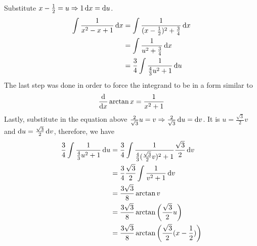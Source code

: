 \begin{solution}
    Substitute \(x - \frac{1}{2} = u \Rightarrow 1 \mathop{}\!\mathrm{d} x = \mathop{}\!\mathrm{d} u\).
    \begin{align}
        \int \frac{1}{x^2 -x + 1} \mathop{}\!\mathrm{d} x &= \int \frac{1}{(x - \frac{1}{2})^2 + \frac{3}{4}} \mathop{}\!\mathrm{d} x\\
        &= \int \frac{1}{u^2 + \frac{3}{4}} \mathop{}\!\mathrm{d} x \\
        &= \frac{3}{4} \int \frac{1}{\frac{4}{3} u^2 + 1} \mathop{}\!\mathrm{d} u
    \end{align}
    The last step was done in order to force the integrand to be in a form similar to
    \begin{align}
        \frac{\mathop{}\!\mathrm{d}}{\mathop{}\!\mathrm{d} x} \arctan x = \frac{1}{x^2 + 1}
    \end{align}
    Lastly, substitute in the equation above \(\frac{2}{\sqrt{3}} u = v \Rightarrow \frac{2}{\sqrt{3}} \mathop{}\!\mathrm{d} u = \mathop{}\!\mathrm{d} v\). It is \(u = \frac{\sqrt{3}}{2} v\) and \(\mathop{}\!\mathrm{d} u = \frac{\sqrt{3}}{2} \mathop{}\!\mathrm{d} v\), therefore, we have
    \begin{align}
        \frac{3}{4} \int \frac{1}{\frac{4}{3} u^2 + 1} \mathop{}\!\mathrm{d} u &= \frac{3}{4} \int \frac{1}{\frac{4}{3} (\frac{\sqrt{3}}{2}v)^2 + 1} \frac{\sqrt{3}}{2} \mathop{}\!\mathrm{d} v \\
        &= \frac{3}{4} \frac{\sqrt{3}}{2} \int \frac{1}{v^2 + 1} \mathop{}\!\mathrm{d} v \\
        &= \frac{3 \sqrt{3}}{8} \arctan v  \\
        &= \frac{3 \sqrt{3}}{8} \arctan \left( \frac{\sqrt{3}}{2}u \right) \\
        &= \frac{3 \sqrt{3}}{8} \arctan \left( \frac{\sqrt{3}}{2}(x - \frac{1}{2})\right)
    \end{align}
\end{solution}